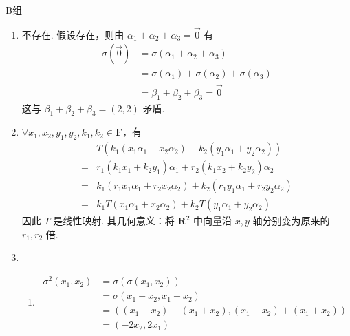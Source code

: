 \centerline{\heiti B组}
\begin{enumerate}
    \item 不存在. 假设存在，则由 $ \alpha_1 + \alpha_2 + \alpha_3 = \vec{0} $ 有
          \begin{align*}
              \sigma(\vec{0}) & = \sigma(\alpha_1 + \alpha_2 + \alpha_3)                 \\
                              & = \sigma(\alpha_1) + \sigma(\alpha_2) + \sigma(\alpha_3) \\
                              & = \beta_1 + \beta_2 + \beta_3 = \vec{0}
          \end{align*}
          这与 $ \beta_1 + \beta_2 + \beta_3 = (2, 2) $ 矛盾.

    \item $ \forall x_1, x_2, y_1, y_2, k_1, k_2 \in \mathbf{F} $，有
          \begin{align*}
                  & T(k_1(x_1 \alpha_1 + x_2 \alpha_2) + k_2(y_1 \alpha_1 + y_2 \alpha_2))                \\
              ={} & r_1(k_1 x_1 + k_2 y_1) \alpha_1 + r_2(k_1 x_2 + k_2 y_2) \alpha_2                     \\
              ={} & k_1 (r_1 x_1 \alpha_1 + r_2 x_2 \alpha_2) + k_2 (r_1 y_1 \alpha_1 + r_2 y_2 \alpha_2) \\
              ={} & k_1 T(x_1 \alpha_1 + x_2 \alpha_2) + k_2 T(y_1 \alpha_1 + y_2 \alpha_2)
          \end{align*}
          因此 $ T $ 是线性映射. 其几何意义：将 $ \mathbf{R}^2 $ 中向量沿 $ x, y $ 轴分别变为原来的 $ r_1, r_2 $ 倍.

    \item \begin{enumerate}
              \item \begin{align*}
                        \sigma^2(x_1, x_2) & = \sigma(\sigma(x_1, x_2))                               \\
                                           & = \sigma(x_1 - x_2, x_1 + x_2)                           \\
                                           & = ((x_1 - x_2) - (x_1 + x_2), (x_1 - x_2) + (x_1 + x_2)) \\
                                           & = (-2 x_2, 2 x_1)
                    \end{align*}


\end{enumerate}
\end{enumerate}
